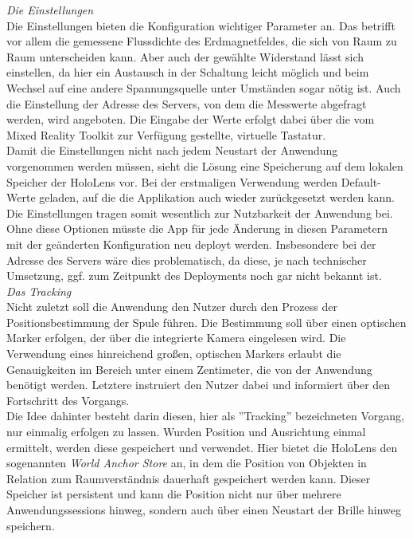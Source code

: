 \textit{Die Einstellungen}\\
Die Einstellungen bieten die Konfiguration wichtiger Parameter an. Das betrifft vor allem die gemessene Flussdichte des Erdmagnetfeldes, die sich von Raum zu Raum unterscheiden kann. Aber auch der gewählte Widerstand lässt sich einstellen, da hier ein Austausch in der Schaltung leicht möglich und beim Wechsel auf eine andere Spannungsquelle unter Umständen sogar nötig ist. Auch die Einstellung der Adresse des Servers, von dem die Messwerte abgefragt werden, wird angeboten. Die Eingabe der Werte erfolgt dabei über die vom Mixed Reality Toolkit zur Verfügung gestellte, virtuelle Tastatur.\\

Damit die Einstellungen nicht nach jedem Neustart der Anwendung vorgenommen werden müssen, sieht die Lösung eine Speicherung auf dem lokalen Speicher der HoloLens vor. Bei der erstmaligen Verwendung werden Default-Werte geladen, auf die die Applikation auch wieder zurückgesetzt werden kann. Die Einstellungen tragen somit wesentlich zur Nutzbarkeit der Anwendung bei. Ohne diese Optionen müsste die App für jede Änderung in diesen Parametern mit der geänderten Konfiguration neu deployt werden. Insbesondere bei der Adresse des Servers wäre dies problematisch, da diese, je nach technischer Umsetzung, ggf. zum Zeitpunkt des Deployments noch gar nicht bekannt ist.\\

\textit{Das Tracking}\\
Nicht zuletzt soll die Anwendung den Nutzer durch den Prozess der Positionsbestimmung der Spule führen. Die Bestimmung soll über einen optischen Marker erfolgen, der über die integrierte Kamera eingelesen wird. Die Verwendung eines hinreichend großen, optischen Markers erlaubt die Genauigkeiten im Bereich unter einem Zentimeter, die von der Anwendung benötigt werden. Letztere instruiert den Nutzer dabei und informiert über den Fortschritt des Vorgangs.\\

Die Idee dahinter besteht darin diesen, hier als ''Tracking'' bezeichneten Vorgang, nur einmalig erfolgen zu lassen. Wurden Position und Ausrichtung einmal ermittelt, werden diese gespeichert und verwendet. Hier bietet die HoloLens den sogenannten \textit{World Anchor Store} an, in dem die Position von Objekten in Relation zum Raumverständnis dauerhaft gespeichert werden kann. Dieser Speicher ist persistent und kann die Position nicht nur über mehrere Anwendungssessions hinweg, sondern auch über einen Neustart der Brille hinweg speichern.\\ 

